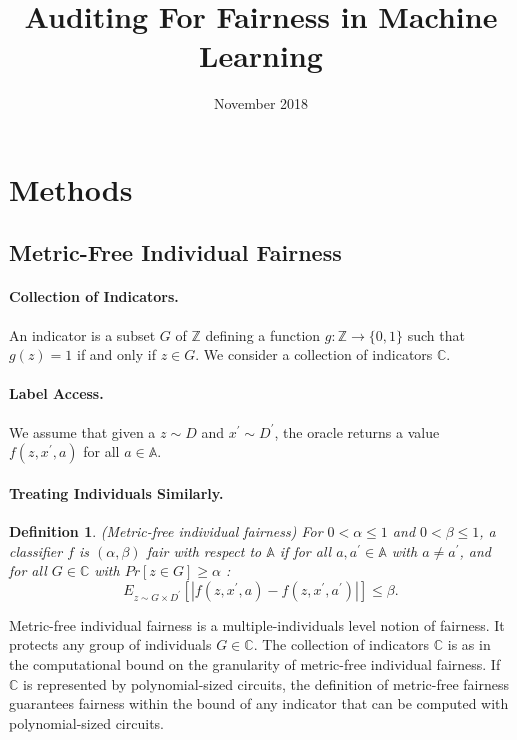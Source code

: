 \documentclass{article}
\title{Auditing For Fairness in Machine Learning}
\author{}
\date{November 2018}
\newtheorem{defn}{Definition}[section]
\begin{document}
\maketitle

\section{Methods}
\subsection{Metric-Free Individual Fairness}

\paragraph{Collection of Indicators.}
An indicator is a subset $G$ of $\mathbb{Z}$ defining a function $g: \mathbb{Z} \rightarrow \{0, 1\}$ such that $g(z)=1$ if and only if $z\in G$. We consider a collection of indicators $ \mathbb{C}$.

\paragraph{Label Access.}
We assume that given a $z\sim D$ and $x^{'}\sim D^{'}$, the oracle returns a value $f(z,x^{'}, a)$ for all $a\in \mathbb{A}$. 

\paragraph{Treating Individuals Similarly.}
\begin{defn}(Metric-free individual fairness)
\label{def: mfif}
For $0<\alpha \leq 1$ and $0< \beta \leq 1$, a classifier $f$ is $(\alpha, \beta)$ fair with respect to $\mathbb{A}$ if for all $a, a^{'}\in \mathbb{A}$ with $a\neq a^{'}$, and for all $G\in \mathbb{C}$ with $Pr[z\in G] \geq \alpha$ :
$$  E_{z\sim G \times D^{'}}[|f(z, x^{'}, a) - f(z, x^{'}, a^{'})|] \leq \beta.$$
\end{defn}
 Metric-free individual fairness is a multiple-individuals level notion of fairness. It protects any group of individuals $G\in \mathbb{C}$. The collection of indicators $\mathbb{C}$ is as in \cite{kim2018fairness} the computational bound on the granularity of metric-free individual fairness. If $\mathbb{C}$ is represented by polynomial-sized circuits, the definition of metric-free fairness guarantees fairness within the bound of any indicator that can be computed with polynomial-sized circuits. 
 
\end{document}
